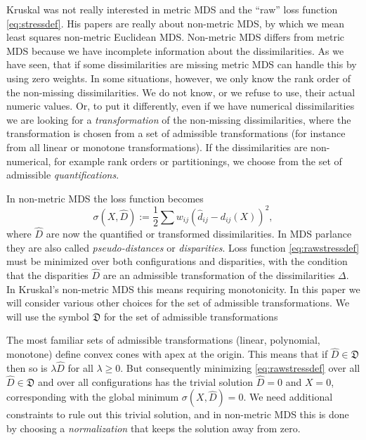 \documentclass[
  12pt,
]{article}
\begin{document}
Kruskal was not really interested in
metric MDS and the ``raw'' loss function \eqref{eq:stressdef}. His papers are really about
non-metric MDS, by which we mean least squares non-metric Euclidean MDS. Non-metric MDS differs from metric MDS because we have incomplete information about the
dissimilarities. As we have seen, that if some dissimilarities are missing
metric MDS can handle this by using zero weights. In some situations, however,
we only know the rank order of the non-missing dissimilarities.
We do not know, or we refuse to use,
their actual numeric values. Or, to put it differently, even if we have numerical dissimilarities we are looking
for a \emph{transformation} of the non-missing dissimilarities, where the transformation
is chosen from a set of admissible transformations (for instance
from all linear or monotone transformations). If the dissimilarities
are non-numerical, for example rank orders or partitionings, we
choose from the set of admissible \emph{quantifications}.

In non-metric MDS the loss function becomes
\begin{equation}
\sigma(X,\hat D):=\frac12\sum w_{ij}(\hat d_{ij}-d_{ij}(X))^2,
\label{eq:rawstressdef}
\end{equation}
where \(\hat D\) are now the quantified or transformed dissimilarities. In
MDS parlance they are also called \emph{pseudo-distances} or \emph{disparities}.
Loss function \eqref{eq:rawstressdef} must be minimized over both
configurations and disparities, with the condition that the disparities
\(\hat D\) are an admissible transformation of the dissimilarities \(\Delta\).
In Kruskal's non-metric MDS this means requiring monotonicity. In this paper
we will consider various other choices for the set of admissible
transformations. We will use the symbol \(\mathfrak{D}\) for the set of
admissible transformations

The most familiar sets of admissible transformations (linear, polynomial, monotone)
define convex cones with apex at the origin. This means that if \(\hat D\in\mathfrak{D}\) then
so is \(\lambda\hat D\) for all \(\lambda\geq 0\). But consequently minimizing
\eqref{eq:rawstressdef} over all \(\hat D\in\mathfrak{D}\) and over all
configurations has the trivial solution \(\hat D=0\) and \(X=0\), corresponding with
the global minimum \(\sigma(X,\hat D)=0\). We need additional constraints to rule out this trivial solution, and in non-metric MDS this is done by choosing a \emph{normalization} that keeps the solution away from zero.
\end{document}
